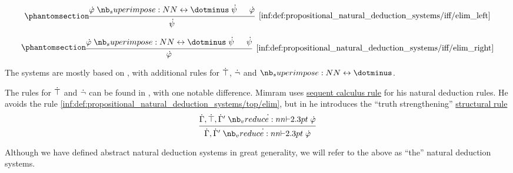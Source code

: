 \begin{definition}
\begin{thmenum}
\begin{paracol}{3}
      \begin{nthcolumn}{1}
        \ParacolAlignmentHack
        \begin{equation*}\taglabel[\ensuremath{ \leftrightarrow_{-L} }]{inf:def:propositional_natural_deduction_systems/iff/elim_left}
          \begin{prooftree}
            \hypo{ \syn\varphi \syniff \syn\psi }
            \hypo{ \syn\varphi }
            \infer2[\ref{inf:def:propositional_natural_deduction_systems/iff/elim_left}]{ \syn\psi }
          \end{prooftree}
        \end{equation*}
      \end{nthcolumn}

      \begin{nthcolumn}{2}
        \ParacolAlignmentHack
        \begin{equation*}\taglabel[\ensuremath{ \leftrightarrow_{-R} }]{inf:def:propositional_natural_deduction_systems/iff/elim_right}
          \begin{prooftree}
            \hypo{ \syn\varphi \syniff \syn\psi }
            \hypo{ \syn\psi }
            \infer2[\ref{inf:def:propositional_natural_deduction_systems/iff/elim_right}]{ \syn\varphi }
          \end{prooftree}
        \end{equation*}
      \end{nthcolumn}
    \end{paracol}
  \end{thmenum}
\end{definition}
\begin{comments}
  \item The systems are mostly based on \cite[def. 2.1.1]{TroelstraSchwichtenberg2000BasicProofTheory}, with additional rules for \( \dot{\top} \), \( \dot{\neg} \) and \( \syniff \).

  The rules for \( \dot{\top} \) and \( \dot{\neg} \) can be found in \cite[fig. 2.5]{Mimram2020ProgramEqualsProof}, with one notable difference. Mimram uses \hyperref[def:abstract_propositional_sequent_calculus_system]{sequent calculus rule} for his natural deduction rules. He avoids the rule \ref{inf:def:propositional_natural_deduction_systems/top/elim}, but in \cite[prop. 2.2.7.4]{Mimram2020ProgramEqualsProof} he introduces the \enquote{truth strengthening} \hyperref[def:abstract_propositional_sequent_calculus_system]{structural rule}
  \begin{equation*}
    \begin{prooftree}
      \hypo{ \syn\Gamma, \syntop, \syn\Gamma' \synvdash \syn\varphi }
      \infer1{ \syn\Gamma, \syn\Gamma' \synvdash \syn\varphi }
    \end{prooftree}
  \end{equation*}

  \item Although we have defined abstract natural deduction systems in great generality, we will refer to the above as \enquote{the} natural deduction systems.
\end{comments}

